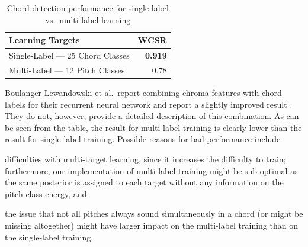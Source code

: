 \documentclass{article}
\begin{document}
\begin{table}
\centering
\begin{tabular*}{\columnwidth}{@{\extracolsep{\fill}}lr}
\toprule
\textbf{Learning Targets} & \textbf{WCSR}  \\ \midrule
Single-Label --- 25 Chord Classes & \textbf{0.919} \\
Multi-Label --- 12 Pitch Classes & 0.78  \\ \bottomrule
\end{tabular*}
\caption{Chord detection performance for single-label vs.\ multi-label learning}
\label{tab:multilabel}
\end{table}
Boulanger-Lewandowski et al.\ report combining chroma features with chord labels for their recurrent neural network and report a slightly improved result \cite{boulanger2013audio}. They do not, however, provide a detailed description of this combination. 
As can be seen from the table, the result for multi-label training is clearly lower than the result for single-label training.
Possible reasons for bad performance include
\begin{inparaenum}[(i)]
    \item   difficulties with multi-target learning, since it increases the difficulty to train; furthermore, our implementation of multi-label training might be sub-optimal as the same posterior is assigned to each target without any information on the pitch class energy, and
    \item   the issue that not all pitches always sound simultaneously in a chord (or might be missing altogether) might have larger impact on the multi-label training than on the single-label training.    
\end{inparaenum}
\end{document}
